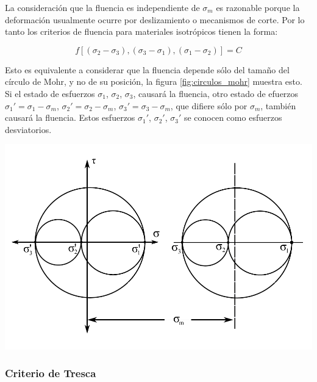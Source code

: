 La consideración que la fluencia es independiente de $\sigma_m$ es razonable porque la deformación 
usualmente ocurre por deslizamiento o mecanismos de corte. Por lo tanto los criterios de fluencia 
para materiales isotrópicos tienen la forma: ~\cite{hosford2007}

\begin{equation}
f[(\sigma_2-\sigma_3 ),(\sigma_3-\sigma_1 ),(\sigma_1-\sigma_2 )] = C
\end{equation}

Esto es equivalente a considerar que la fluencia depende sólo del tamaño del círculo de Mohr, 
y no de su posición, la figura \ref{fig:circulos_mohr} muestra esto. Si el estado de esfuerzos 
$\sigma_1$, $\sigma_2$, $\sigma_3$, causará la fluencia, otro estado de efuerzos 
$\sigma_1' = \sigma_1 - \sigma_m $, $\sigma_2' = \sigma_2 - \sigma_m $, $\sigma_3' = \sigma_3 - \sigma_m $, 
que difiere sólo por $\sigma_m$, también causará la fluencia. Estos esfuerzos $\sigma_1'$, $\sigma_2'$, 
$\sigma_3'$ se conocen como esfuerzos desviatorios. ~\cite{hosford2007}

\begin{center}
\includegraphics[scale=0.75]{src/ch2/circulos_mohr_svg}
\label{fig:circulos_mohr}
\end{center}


\subsubsection{Criterio de Tresca}


